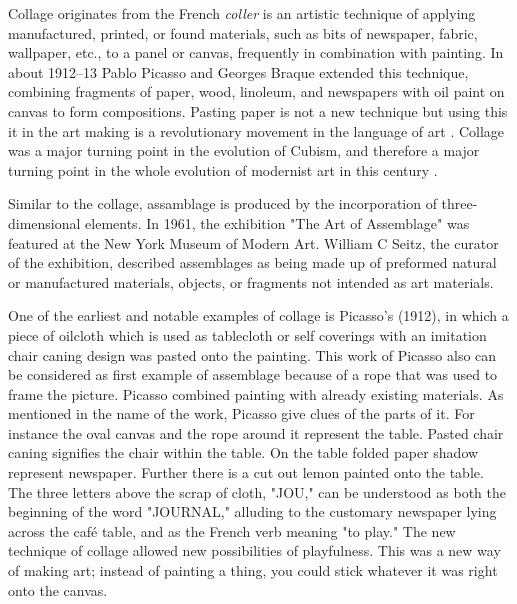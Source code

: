 
Collage originates from the French \textit{coller} is an artistic technique of applying manufactured, printed, or found materials, such as bits of newspaper, fabric, wallpaper, etc., to a panel or canvas, frequently in combination with painting. In about 1912–13 Pablo Picasso and Georges Braque extended this technique, combining fragments of paper, wood, linoleum, and newspapers with oil paint on canvas to form compositions. Pasting paper is not a new technique but using this it in the art making is a revolutionary movement in the  language of art \citep{waldman1992collage}. Collage was a major turning point in the evolution of Cubism, and therefore a major turning point in the whole evolution of modernist art in this century \citep{greenberg1984collage}. 

Similar to the collage, assamblage is produced by the incorporation of three-dimensional elements. In 1961, the exhibition "The Art of Assemblage" was featured at the New York Museum of Modern Art. William C Seitz, the curator of the exhibition, described assemblages as being made up of preformed natural or manufactured materials, objects, or fragments not intended as art materials. 


One of the earliest and notable examples of collage is Picasso’s  (1912), in which a piece of oilcloth which is used as tablecloth or self coverings with an imitation chair caning design was pasted onto the painting. This work of Picasso also can be considered as first example of assemblage because of a rope that was used to frame the picture. Picasso combined painting with already existing materials. As mentioned in the name of the work, Picasso give clues of the parts of it. For instance the oval canvas and the rope around it represent the table. Pasted chair caning signifies the chair within the table. On the table folded paper shadow represent newspaper. Further there is a cut out lemon painted onto the table. The three letters above the scrap of cloth, "JOU," can be understood as both the beginning of the word "JOURNAL," alluding to the customary newspaper lying across the café table, and as the French verb meaning "to play." The new technique of collage allowed new possibilities of playfulness. This was a new way of making art; instead of painting a thing, you could stick whatever it was right onto the canvas.

